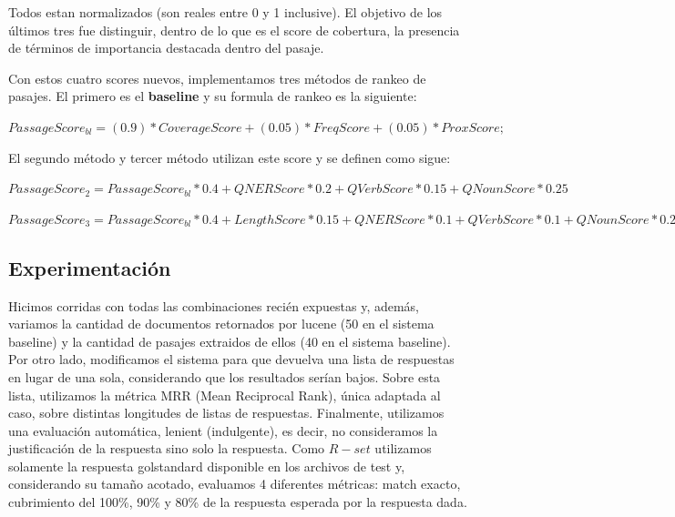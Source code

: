Todos estan normalizados (son reales entre 0 y 1 inclusive). El objetivo de los últimos tres fue distinguir, dentro de lo que es el score de cobertura, la presencia de términos de importancia destacada dentro del pasaje. 


Con estos cuatro scores nuevos, implementamos tres métodos de rankeo de pasajes. El primero es el \textbf{baseline} y su formula de rankeo es la siguiente: \newline

$PassageScore_{bl} = (0.9)*CoverageScore + (0.05)*FreqScore+ (0.05)*ProxScore;$ \newline

El segundo método y tercer método utilizan este score y se definen como sigue:\newline

$PassageScore_2 =  PassageScore_{bl} * 0.4 + QNERScore * 0.2 + QVerbScore*0.15	+ QNounScore * 0.25 $\newline

$PassageScore_3 =  PassageScore_{bl} * 0.4 + LengthScore * 0.15 + QNERScore * 0.1 + QVerbScore*0.1	+ QNounScore * 0.25 $\newline


\subsection{Experimentación}
\label{sec:eval}

Hicimos corridas con todas las combinaciones recién expuestas y, además, variamos la cantidad de documentos retornados por lucene (50 en el sistema baseline) y la cantidad de pasajes extraidos de ellos (40 en el sistema baseline).  Por otro lado, modificamos el sistema para que devuelva una lista de respuestas en lugar de una sola, considerando que los resultados serían bajos. Sobre esta lista, utilizamos la métrica MRR (Mean Reciprocal Rank), única adaptada al caso, sobre distintas longitudes de listas de respuestas. Finalmente, utilizamos una evaluación automática, lenient (indulgente), es decir, no consideramos la justificación de la respuesta sino solo la respuesta. Como $R-set$ utilizamos solamente la respuesta golstandard disponible en los archivos de test y, considerando su tamaño acotado, evaluamos 4 diferentes métricas: match exacto, cubrimiento del 100\%, 90\% y 80\% de la respuesta esperada por la respuesta dada. 



